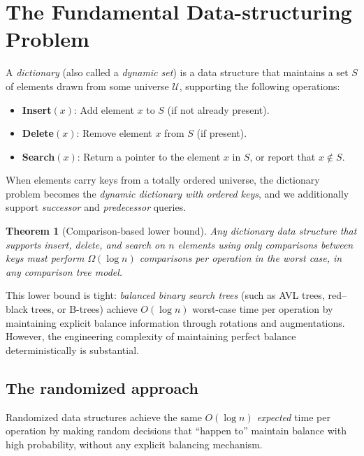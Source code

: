 \documentclass[twoside,12pt]{book}
\theoremstyle{plain}
\newtheorem{theorem}{Theorem}[chapter]
\theoremstyle{definition}
\theoremstyle{remark}
\begin{document}
\section{The Fundamental Data-structuring Problem}
\label{sec:fundamental-data-structuring}

A \emph{dictionary} (also called a \emph{dynamic set}) is a data structure that maintains a set $S$ of elements drawn from some universe $\mathcal{U}$, supporting the following operations:

\begin{itemize}[nosep]
    \item \textbf{Insert}$(x)$: Add element $x$ to $S$ (if not already present).
    \item \textbf{Delete}$(x)$: Remove element $x$ from $S$ (if present).
    \item \textbf{Search}$(x)$: Return a pointer to the element $x$ in $S$, or report that $x \notin S$.
\end{itemize}

When elements carry keys from a totally ordered universe, the dictionary problem becomes the \emph{dynamic dictionary with ordered keys}, and we additionally support \emph{successor} and \emph{predecessor} queries.

\begin{theorem}[Comparison-based lower bound]
Any dictionary data structure that supports insert, delete, and search on $n$ elements using only comparisons between keys must perform $\Omega(\log n)$ comparisons per operation in the worst case, in any comparison tree model.
\end{theorem}

This lower bound is tight: \emph{balanced binary search trees} (such as AVL trees, red--black trees, or B-trees) achieve $O(\log n)$ worst-case time per operation by maintaining explicit balance information through rotations and augmentations. However, the engineering complexity of maintaining perfect balance deterministically is substantial.

\subsection{The randomized approach}

Randomized data structures achieve the same $O(\log n)$ \emph{expected} time per operation by making random decisions that ``happen to'' maintain balance with high probability, without any explicit balancing mechanism.
\end{document}
